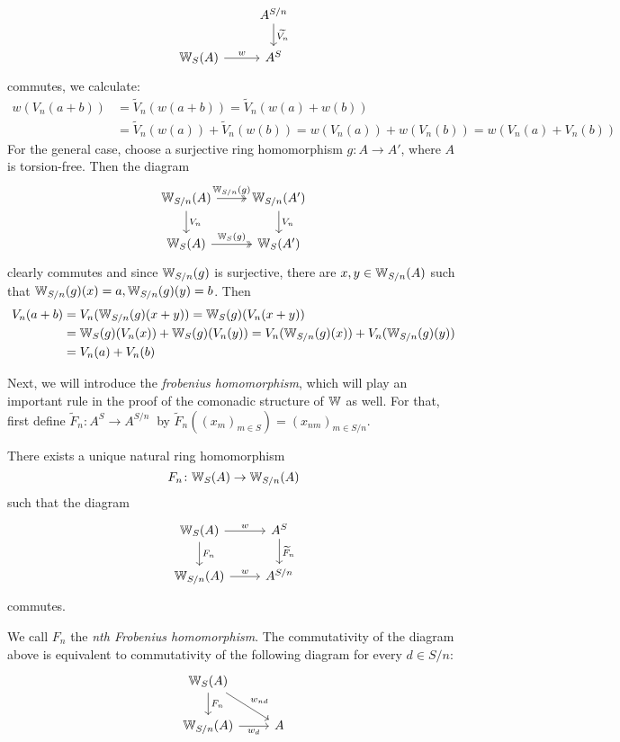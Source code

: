 \begin{bigproof}
\[\begin{tikzcd}
            & A^{S/n} \arrow[d,"\widetilde{V_n}"]\\
            \W_S(A) \arrow[r,"w"]
            & A^S
        \end{tikzcd}
    \]
    commutes, we calculate:
    \begin{align*}
        w(V_n(a+b)) &= \widetilde{V}_n(w(a+b))= \widetilde{V}_n(w(a)+w(b)) \\
        &= \widetilde{V}_n(w(a))+\widetilde{V}_n(w(b))
        = w(V_n(a))+w(V_n(b))= w(V_n(a)+V_n(b))
    \end{align*}
    For the general case, choose a surjective ring homomorphism $g \colon A \to A'$,
    where $A$ is torsion-free. Then the diagram
    \[
       \begin{tikzcd}
           \W_{S/n}(A) \arrow[r,"\W_{S/n}(g)",twoheadrightarrow] \arrow[d,"V_n"] 
             & \W_{S/n}(A') \arrow[d,"V_n"] \\
           \W_S(A) \arrow[r,"\W_S(g)",twoheadrightarrow]
             & \W_S(A')
       \end{tikzcd} 
    \]
    clearly commutes and since $\mathbb{W}_{S/n}(g)$ is surjective, there are $x,y \in \mathbb{W}_{S/n}(A)$
    such that $\mathbb{W}_{S/n}(g)(x)=a, \mathbb{W}_{S/n}(g)(y)=b$.
    Then 
    \begin{align*}
        V_n(a+b) &= V_n(\mathbb{W}_{S/n}(g)(x+y))=\mathbb{W}_S(g)(V_n(x+y)) \\
        &= \mathbb{W}_S(g)(V_n(x)) + \mathbb{W}_S(g)(V_n(y)) = V_n(\mathbb{W}_{S/n}(g)(x)) + V_n(\mathbb{W}_{S/n}(g)(y)) \\
        &= V_n(a)+V_n(b)
    \end{align*}
    \todo{}
\end{bigproof}
Next, we will introduce the \textit{frobenius homomorphism}, which will play 
an important rule in the proof of the comonadic structure of $\mathbb{W}$ as well.
For that, first define $\widetilde{F}_n \colon A^S \to A^{S/n} \ $
by $\widetilde{F}_n((x_m)_{m \in S}) = (x_{nm})_{m \in S/n}$.
\begin{lemma} \label{lem: frobenius}
    There exists a unique natural ring homomorphism
    \[
      F_n \colon \mathbb{W}_S(A) \to \mathbb{W}_{S/n}(A)  
    \]
    such that the diagram 
    \[
        \begin{tikzcd}
            \W_S(A) \arrow[r,"w"] \arrow[d,"F_n"] 
              & A^S \arrow[d,"\widetilde{F}_n"] \\
            \W_{S/n}(A) \arrow[r,"w"]
              & A^{S/n}
        \end{tikzcd}        
    \]
    commutes.
\end{lemma}
    We call $F_n$ the \textit{nth Frobenius homomorphism}.
    The commutativity of the diagram above is equivalent to
    commutativity of the following diagram for every $d \in S/n$:
    \[
        \begin{tikzcd}
            \W_S(A) \arrow[d,"F_n"] \arrow[dr,"w_{nd}"] \\
            \W_{S/n}(A) \arrow[r,"w_d"'] 
            & A
        \end{tikzcd}
    \]

